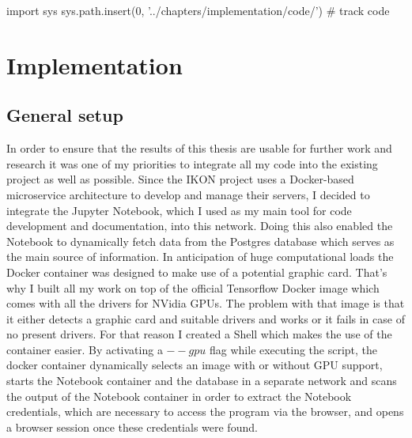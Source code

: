 % 
\begin{pycode}
import sys
sys.path.insert(0, '../chapters/implementation/code/')
# track code

\end{pycode}

\chapter{Implementation}
\label{chap:implementation}

\section{General setup}

In order to ensure that the results of this thesis are usable for further work and research it was one of my priorities to integrate all my code into the existing project as well as possible. Since the IKON project uses a Docker-based microservice architecture to develop and manage their servers, I decided to integrate the Jupyter Notebook, which I used as my main tool for code development and documentation, into this network. Doing this also enabled the Notebook to dynamically fetch data from the Postgres database which serves as the main source of information.
In anticipation of huge computational loads the Docker container was designed to make use of a potential graphic card. That's why I built all my work on top of the official Tensorflow Docker image which comes with all the drivers for NVidia GPUs. The problem with that image is that it either detects a graphic card and suitable drivers and works or it fails in case of no present drivers. For that reason I created a Shell which makes the use of the container easier. By activating a $--gpu$ flag while executing the script, the docker container dynamically selects an image with or without GPU support, starts the Notebook container and the database in a separate network and scans the output of the Notebook container in order to extract the Notebook credentials, which are necessary to access the program via the browser, and opens a browser session once these credentials were found.

